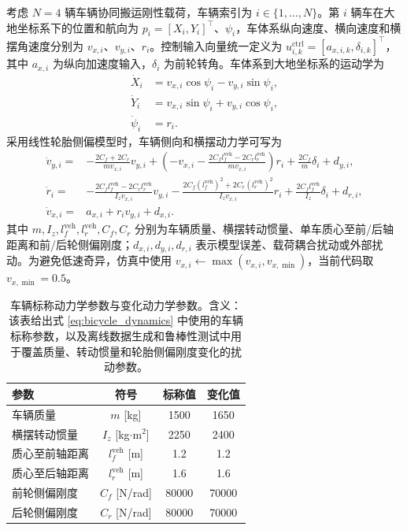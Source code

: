 \documentclass[twocolumn,3p,times,procedia]{elsarticle}
\begin{document}
考虑 $N=4$ 辆车辆协同搬运刚性载荷，车辆索引为 $i\in\{1,\ldots,N\}$。第 $i$ 辆车在大地坐标系下的位置和航向为
$p_i=[X_i,Y_i]^\top$、$\psi_i$，车体系纵向速度、横向速度和横摆角速度分别为 $v_{x,i}$、$v_{y,i}$、$r_i$。控制输入向量统一定义为 $u_{i,k}^{\mathrm{ctrl}}=[a_{x,i,k},\delta_{i,k}]^\top$，其中 $a_{x,i}$ 为纵向加速度输入，$\delta_i$ 为前轮转角。车体系到大地坐标系的运动学为
\begin{equation}
\begin{aligned}
\dot X_i &= v_{x,i}\cos\psi_i-v_{y,i}\sin\psi_i,\\
\dot Y_i &= v_{x,i}\sin\psi_i+v_{y,i}\cos\psi_i,\\
\dot \psi_i &= r_i .
\end{aligned}
\label{eq:world_kinematics}
\end{equation}
采用线性轮胎侧偏模型时，车辆侧向和横摆动力学可写为
\begin{equation}
\begin{aligned}
\dot v_{y,i}=&-\frac{2C_f+2C_r}{m v_{x,i}}v_{y,i}+
\left(-v_{x,i}-\frac{2C_f l_f^{\mathrm{veh}}-2C_r l_r^{\mathrm{veh}}}{m v_{x,i}}\right)r_i
+\frac{2C_f}{m}\delta_i+d_{y,i},\\
\dot r_i=&-\frac{2C_f l_f^{\mathrm{veh}}-2C_r l_r^{\mathrm{veh}}}{I_z v_{x,i}}v_{y,i}
-\frac{2C_f (l_f^{\mathrm{veh}})^2+2C_r (l_r^{\mathrm{veh}})^2}{I_z v_{x,i}}r_i
+\frac{2C_f l_f^{\mathrm{veh}}}{I_z}\delta_i+d_{r,i},\\
\dot v_{x,i}=&a_{x,i}+r_i v_{y,i}+d_{x,i}.
\end{aligned}
\label{eq:bicycle_dynamics}
\end{equation}
其中 $m,I_z,l_f^{\mathrm{veh}},l_r^{\mathrm{veh}},C_f,C_r$ 分别为车辆质量、横摆转动惯量、单车质心至前/后轴距离和前/后轮侧偏刚度；$d_{x,i},d_{y,i},d_{r,i}$ 表示模型误差、载荷耦合扰动或外部扰动。为避免低速奇异，仿真中使用 $v_{x,i}\leftarrow\max(v_{x,i},v_{x,\min})$，当前代码取 $v_{x,\min}=0.5$。

\begin{table}[!tbp]
\centering
\caption{车辆标称动力学参数与变化动力学参数。含义：该表给出式 \eqref{eq:bicycle_dynamics} 中使用的车辆标称参数，以及离线数据生成和鲁棒性测试中用于覆盖质量、转动惯量和轮胎侧偏刚度变化的扰动参数。}
\label{tab:vehicle_dynamic_params}
\footnotesize
\begin{tabular}{lccc}
\toprule
参数 & 符号 & 标称值 & 变化值 \\
\midrule
车辆质量 & $m$ [kg] & 1500 & 1650\\
横摆转动惯量 & $I_z$ [kg$\cdot$m$^2$] & 2250 & 2400\\
质心至前轴距离 & $l_f^{\mathrm{veh}}$ [m] & 1.2 & 1.2\\
质心至后轴距离 & $l_r^{\mathrm{veh}}$ [m] & 1.6 & 1.6\\
前轮侧偏刚度 & $C_f$ [N/rad] & 80000 & 70000\\
后轮侧偏刚度 & $C_r$ [N/rad] & 80000 & 70000\\
\bottomrule
\end{tabular}
\end{table}
\end{document}

